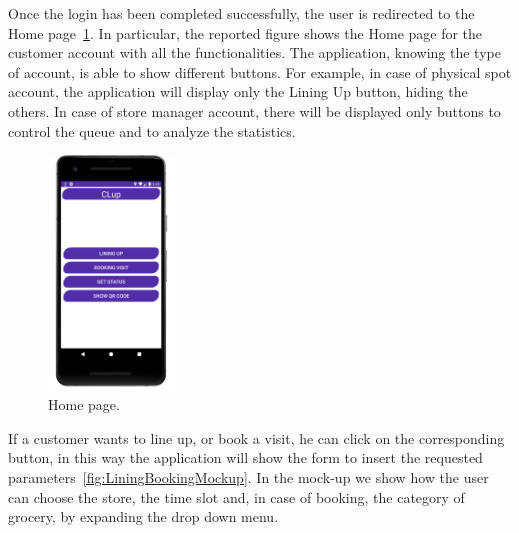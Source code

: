 Once the login has been completed successfully, the user is redirected to the Home page~\ref{fig:HomeMockup}.
In particular, the reported figure shows the Home page for the customer account with all the functionalities. The application, knowing the type of account, is able to show different buttons. For example, in case of physical spot account, the application will display only the Lining Up button, hiding the others. In case of store manager account, there will be displayed only buttons to control the queue and to analyze the statistics.

\begin{figure}[H]
    \centering
    \includegraphics[width=0.3\textwidth]{images/home.png}
    \caption{Home page.}
    \label{fig:HomeMockup}
\end{figure}

If a customer wants to line up, or book a visit, he can click on the corresponding button, in this way the application will show the form to insert the requested parameters~\ref{fig:LiningBookingMockup}.
In the mock-up we show how the user can choose the store, the time slot and, in case of booking, the category of grocery, by expanding the drop down menu.

